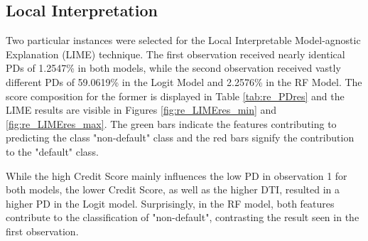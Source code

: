 \subsection{Local Interpretation}
Two particular instances were selected for the Local Interpretable Model-agnostic Explanation (LIME) technique. The first observation received nearly identical PDs of 1.2547\% in both models, while the second observation received vastly different PDs of 59.0619\% in the Logit Model and 2.2576\% in the RF Model. The score composition for the former is displayed in Table \ref{tab:re_PDres} and the LIME results are visible in Figures \ref{fig:re_LIMEres_min} and \ref{fig:re_LIMEres_max}. The green bars indicate the features contributing to predicting the class "non-default" class and the red bars signify the contribution to the "default" class. 

While the high Credit Score mainly influences the low PD in observation 1 for both models, the lower Credit Score, as well as the higher DTI, resulted in a higher PD in the Logit model. Surprisingly, in the RF model, both features contribute to the classification of "non-default", contrasting the result seen in the first observation.

